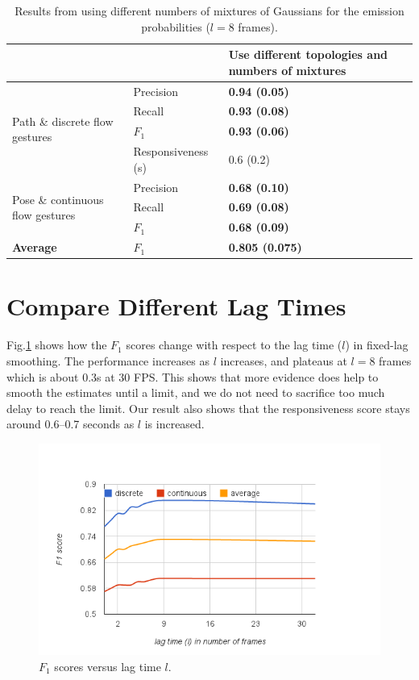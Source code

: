 \begin{table}[t]
\centering
\begin{tabular}{|p{4.5cm}|l|p{4cm}|}
\hline
& & Use different topologies and numbers of mixtures \\
\hline
\multirow{4}{4cm}{Path \& discrete flow gestures} 
& Precision & \textbf{0.94 (0.05)} \\
\cline{2-3}
& Recall    & \textbf{0.93 (0.08)} \\
\cline{2-3}
& $F_1$ & \textbf{0.93 (0.06)} \\
\cline{2-3}
& Responsiveness (s) & 0.6 (0.2)  \\
\hline
\multirow{3}{4cm}{Pose \& continuous flow gestures}
& Precision & \textbf{0.68 (0.10)} \\
\cline{2-3}
& Recall & \textbf{0.69 (0.08)} \\
\cline{2-3}
& $F_1$ & \textbf{0.68 (0.09)}  \\
\hline
\textbf{Average} & $F_1$ & \textbf{0.805 (0.075)}\\
\hline
\end{tabular}
\caption{Results from using different numbers of mixtures of Gaussians
for the emission probabilities ($l = 8$ frames).}
\label{tab:different-mixtures}
\end{table}


\section{Compare Different Lag Times}
Fig.\ref{fig:lag} shows how the $F_1$ scores change with respect to the lag
time ($l$) in fixed-lag smoothing. The performance increases as $l$ increases, and
plateaus at $l=8$ frames which is about 0.3s at 30 FPS. This shows that more
evidence does help to smooth the estimates until a limit, and we do not need to
sacrifice too much delay to reach the limit. Our result also shows that the
responsiveness score stays around 0.6--0.7 seconds as $l$ is increased.

\begin{figure}[tbh]
\centering
\includegraphics[trim=0 5mm 0 15mm, clip,
width=\columnwidth]{figures/f1_lag.png}
\caption{$F_1$ scores versus lag time $l$.}
\label{fig:lag}
\end{figure}

